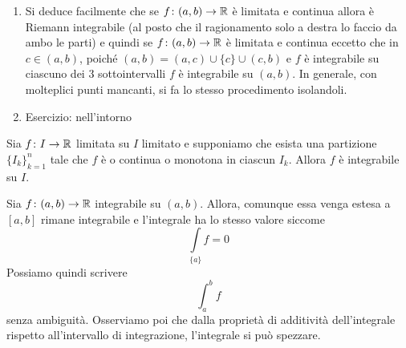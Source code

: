 \documentclass[a4paper]{article}
\begin{document}
\begin{snippetproof}{}
\begin{enumerate}
\begin{enumerate}
\[            \]
            Siccome \(\varphi_\varepsilon, \psi_\varepsilon\) sono a scala, \(\varphi_\varepsilon \leq f \leq \psi_\varepsilon\)
            in \([a,b]\) e
            \begin{align*}
                0 \leq \int\limits_{[a,b)} \psi_\varepsilon - \int\limits_{[a,b)} \varphi_\varepsilon
                &= \left(\,
                    \int\limits_{[a,b-\delta]} \psi_\varepsilon' -
                    \int\limits_{[a,b-\delta]} \varphi_\varepsilon'
                \right) \\
                 &+ \left(\,
                    \int\limits_{[b-\delta, b)} M - \int\limits_{[b-\delta, b)} (-M)
                 \right) \\
                 &= \left(\,
                    \int\limits_{[a,b-\delta]} \psi_\varepsilon' -
                    \int\limits_{[a,b-\delta]} \varphi_\varepsilon'
                \right) + 2M\delta \\
                &< \frac{\varepsilon}{2} + \frac{\varepsilon}{2} = \varepsilon
            \end{align*}
        \end{enumerate}
        \item Si deduce facilmente che se \(f\colon (a,b) \to \mathbb{R}\) è limitata e continua allora è Riemann integrabile
        (al posto che il ragionamento solo a destra lo faccio da ambo le parti)
        e quindi se \(f\colon (a,b) \to \mathbb{R}\) è limitata e continua eccetto che in \(c\in (a,b)\),
        poiché \((a,b) = (a,c) \cup \{c\} \cup (c,b)\) e \(f\) è integrabile su ciascuno dei \(3\)
        sottointervalli \(f\) è integrabile su \((a,b)\).
        In generale, con molteplici punti mancanti, si fa lo stesso procedimento isolandoli.
        \item Esercizio: nell'intorno 
    \end{enumerate}
\end{snippetproof}

\begin{snippetcorollary}{}
    Sia \(f\colon I \to \mathbb{R}\) limitata su \(I\) limitato e supponiamo che esista una partizione
    \(\{I_k\}_{k=1}^n\) tale che \(f\) è o continua o monotona in ciascun \(I_k\).
    Allora \(f\) è integrabile su \(I\).
\end{snippetcorollary}

Sia \(f\colon (a,b) \to \mathbb{R}\) integrabile su \((a,b)\).
Allora, comunque essa venga estesa a \([a,b]\) rimane integrabile e l'integrale ha lo stesso valore
siccome
\[
    \int\limits_{\{a\}} f = 0
\]
Possiamo quindi scrivere
\[
    \int_a^b f
\]
senza ambiguità.
Osserviamo poi che dalla proprietà di additività dell'integrale rispetto all'intervallo di integrazione,
l'integrale si può spezzare.
\end{document}
